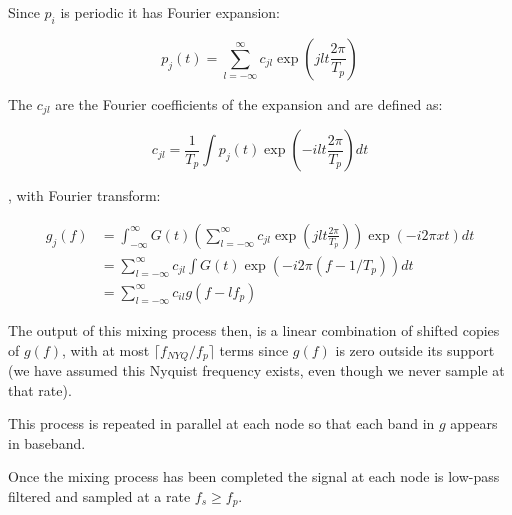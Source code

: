 Since \(p_i\) is periodic it has Fourier expansion:

\begin{equation}
p_j\left(t\right) = \sum_{l=-\infty}^{\infty} c_{jl} \exp\left({jlt\frac{2\pi}{T_p}}\right)
\end{equation}

The \(c_{jl}\) are the Fourier coefficients of the expansion and are defined as:

\begin{equation}
c_{jl} = \frac{1}{T_p} \int p_j\left(t\right)\exp{\left(-ilt\frac{2\pi}{T_p}\right)} dt
\end{equation}

, with Fourier transform:

\begin{align}
g_{j}\left(f\right) &= \int_{-\infty}^{\infty} G\left(t\right) \left( \sum_{l=-\infty}^{\infty} c_{jl} \exp\left({jlt\frac{2\pi}{T_p}} \right)\right) \exp{\left(-i2\pi x t\right)} dt \nonumber \\ 
&= \sum_{l=-\infty}^{\infty} c_{jl} \int G \left(t\right) \exp{\left(-i 2\pi \left( f-1/T_p \right) \right) } dt \\
&= \sum_{l=-\infty}^{\infty} c_{il} g\left(f-lf_p\right)
\end{align}

The output of this mixing process then, is a linear combination of shifted copies of \(g\left(f\right)\), with at most \(\lceil f_{NYQ}/f_p\rceil\) terms since \(g\left(f\right)\) is zero outside its support (we have assumed this Nyquist frequency exists, even though we never sample at that rate).

This process is repeated in parallel at each node so that each band in \(g\) appears in baseband.

Once the mixing process has been completed the signal at each node is low-pass filtered and sampled at a rate \(f_s \geq f_p\).
